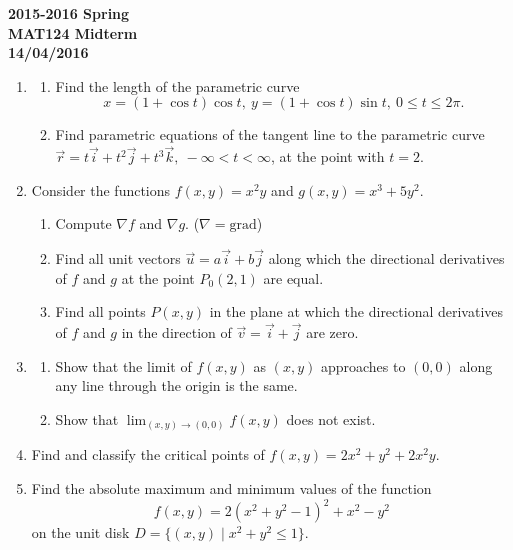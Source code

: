 \documentclass[a4paper, 12pt]{article}
\begin{document}
\newpage
{}
{}

\begin{center}
\textbf{2015-2016 Spring \\MAT124 Midterm\\14/04/2016}
\end{center}

\begin{enumerate}[leftmargin=*,label=\textbf{\arabic*.}]

\item \begin{enumerate}[leftmargin=*,label=\textbf{\alph*.}]
\item Find the length of the parametric curve
\[x= (1+\cos t)\cos t, \: y=(1+\cos t)\sin t,\: 0\leq t\leq 2\pi.\]
\item Find parametric equations of the tangent line to the parametric curve \linebreak $\vec r= t\vec{i}+t^2\vec{j}+t^3\vec{k},\:-\infty<t<\infty$, at the point with $t=2$.
\end{enumerate}

\item Consider the functions $f(x,y)=x^2y$ and $g(x,y)=x^3+5y^2$.
\begin{enumerate}[leftmargin=*,label=\textbf{\alph*.}]
\item Compute $\nabla f$ and $\nabla g$. ($\nabla=\text{grad}$)
\item Find all unit vectors $\vec u=a\vec i+b\vec j$ along which the directional derivatives of $f$ and $g$ at the point $P_0(2,1)$ are equal.
\item Find all points $P(x,y)$ in the plane at which the directional derivatives of $f$ and $g$ in the direction of $\vec v=\vec i+\vec j$ are zero.
\end{enumerate}

\item \begin{enumerate}[leftmargin=*,label=\textbf{\alph*.}]
\item Show that the limit of $f(x,y)$ as $(x,y)$ approaches to $(0,0)$ along any line through the origin is the same.
\item Show that $\displaystyle\lim_{(x,y)\to(0,0)}f(x,y)$ does not exist.
\end{enumerate}

\item Find and classify the critical points of $f(x,y)=2x^2+y^2+2x^2y$.

\item Find the absolute maximum and minimum values of the function
\[f(x,y)=2(x^2+y^2-1)^2+x^2-y^2\]
on the unit disk $D=\{(x,y)\mid x^2+y^2\leq 1\}$.

\end{enumerate}
\end{document}
